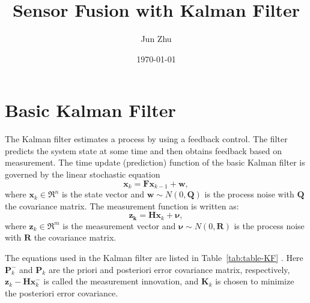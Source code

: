 \documentclass[12pt]{article}
\title{Sensor Fusion with Kalman Filter}
\author{Jun Zhu}
\date{\today}
\begin{document}
\maketitle


\section{Basic Kalman Filter}\label{basic-kalman-filter}

The Kalman filter estimates a process by using a feedback control. The filter predicts the system state at some time and then obtains feedback based on measurement. The time update (prediction) function of the basic Kalman filter is governed by the linear stochastic equation
%
\begin{equation}
	\mathbf{x}_{k} = \mathbf{F}\mathbf{x}_{k - 1} + \mathbf{w},
\end{equation}
%
where \(\mathbf{x}_{k} \in \mathfrak{R}^{n}\) is the state vector and \(\mathbf{w}\sim N( 0,\mathbf{Q})\) is the process noise with \(\mathbf{Q}\) the covariance matrix. The measurement function is written as:
%
\begin{equation}
	\mathbf{z}_{\mathbf{k}} = \mathbf{H}\mathbf{x}_{k} + \mathbf{\nu},
\end{equation}
%
where \(\mathbf{z}_{k} \in \mathfrak{R}^{m}\) is the measurement vector and \(\mathbf{\nu}\sim N( 0,\mathbf{R})\) is the process noise with \(\mathbf{R}\) the covariance matrix.

The equations used in the Kalman filter are listed in Table~\ref{tab:table-KF} \cite{Welch}. Here \(\mathbf{P}_{k}^{-}\) and \(\mathbf{P}_{k}\) are the priori and posteriori error covariance matrix, respectively, \(\mathbf{z}_{k} - \mathbf{H}\mathbf{x}_{k}^{-}\) is called the measurement innovation, and \(\mathbf{K}_{k}\) is chosen to minimize the posteriori error covariance.
\end{document}

